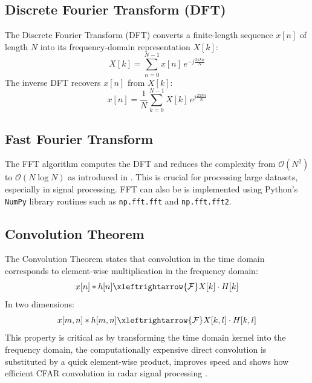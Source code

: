 \documentclass[class=report,11pt,crop=false]{standalone}
\begin{document}
\subsection{Discrete Fourier Transform (DFT)}

The Discrete Fourier Transform (DFT) converts a finite-length sequence $x[n]$ of length $N$ into its frequency-domain representation $X[k]$:
\begin{equation}
    X[k] = \sum_{n=0}^{N-1} x[n]\, e^{-j\frac{2\pi kn}{N}}
\end{equation}
The inverse DFT recovers $x[n]$ from $X[k]$:
\begin{equation}
    x[n] = \frac{1}{N} \sum_{k=0}^{N-1} X[k]\, e^{j\frac{2\pi kn}{N}}
\end{equation}

\subsection{Fast Fourier Transform}

The FFT algorithm computes the DFT and reduces the complexity from $\mathcal{O}(N^2)$ to $\mathcal{O}(N \log N)$ as introduced in \cite{cooley1965algorithm}. This is crucial for processing large datasets, especially in signal processing. FFT can also be is implemented using Python’s \texttt{NumPy} library routines such as \texttt{np.fft.fft} and \texttt{np.fft.fft2}.

\subsection{Convolution Theorem}

The Convolution Theorem states that convolution in the time domain corresponds to element-wise multiplication in the frequency domain:
\begin{equation}
\label{eqn:convolution_1d}
    x[n] * h[n] \xleftrightarrow{\mathcal{F}} X[k] \cdot H[k]
\end{equation}
In two dimensions:
\begin{equation}
\label{eqn:convolution_2d}
    x[m,n] * h[m,n] \xleftrightarrow{\mathcal{F}} X[k,l] \cdot H[k,l]
\end{equation}
This property is critical as by transforming the time domain kernel into the frequency domain, the computationally expensive direct convolution is substituted by a quick element-wise product, improves speed and shows how efficient CFAR convolution in radar signal processing \cite{richards2005fundamentals}.
\end{document}

